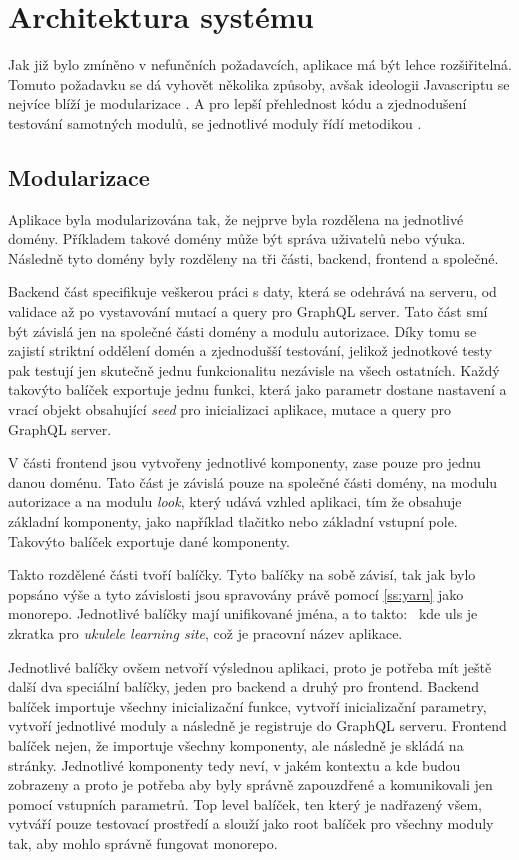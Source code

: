 \section{Architektura systému}
\label{sc:system_architecture}
Jak již bylo zmíněno v nefunčních požadavcích, aplikace má být lehce rozšiřitelná. Tomuto požadavku se dá vyhovět několika způsoby, avšak ideologii Javascriptu se nejvíce blíží je modularizace \cite{bevacqua_2018_mastering}. A pro lepší přehlednost kódu a zjednodušení testování samotných modulů, se jednotlivé moduly řídí metodikou .

\subsection{Modularizace}
Aplikace byla modularizována tak, že nejprve byla rozdělena na jednotlivé domény. Příkladem takové domény může být správa uživatelů nebo výuka. Následně tyto domény byly rozděleny na tři části, backend, frontend a společné.

Backend část specifikuje veškerou práci s daty, která se odehrává na serveru, od validace až po vystavování mutací a query pro GraphQL server. Tato část smí být závislá jen na společné části domény a modulu autorizace. Díky tomu se zajistí striktní oddělení domén a zjednodušší testování, jelikož jednotkové testy pak testují jen skutečně jednu funkcionalitu nezávisle na všech ostatních. Každý takovýto balíček exportuje jednu funkci, která jako parametr dostane nastavení a vrací objekt obsahující \emph{seed} pro inicializaci aplikace, mutace a query pro GraphQL server.

V části frontend jsou vytvořeny jednotlivé komponenty, zase pouze pro jednu danou doménu. Tato část je závislá pouze na společné části domény, na modulu autorizace a na modulu \emph{look}, který udává vzhled aplikaci, tím že obsahuje základní komponenty, jako například tlačitko nebo základní vstupní pole. Takovýto balíček exportuje dané komponenty.

Takto rozdělené části tvoří balíčky. Tyto balíčky na sobě závisí, tak jak bylo popsáno výše a tyto závislosti jsou spravovány právě pomocí \ref{ss:yarn} jako monorepo. Jednotlivé balíčky mají unifikované jména, a to takto:~ kde uls je zkratka pro \emph{ukulele learning site}, což je pracovní název aplikace.

Jednotlivé balíčky ovšem netvoří výslednou aplikaci, proto je potřeba mít ještě další dva speciální balíčky, jeden pro backend a druhý pro frontend. Backend balíček importuje všechny inicializační funkce, vytvoří inicializační parametry, vytvoří jednotlivé moduly a následně je registruje do GraphQL serveru. Frontend balíček nejen, že importuje všechny komponenty, ale následně je skládá na stránky. Jednotlivé komponenty tedy neví, v jakém kontextu a kde budou zobrazeny a proto je potřeba aby byly správně zapouzdřené a komunikovali jen pomocí vstupních parametrů. Top level balíček, ten který je nadřazený všem, vytváří pouze testovací prostředí a slouží jako root balíček pro všechny moduly tak, aby mohlo správně fungovat monorepo.


